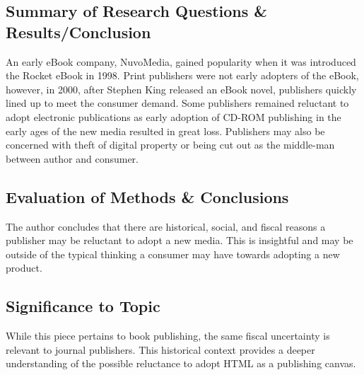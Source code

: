 \documentclass[leavefloats]{apa6e}\usepackage[]{graphicx}\usepackage[]{color}
\begin{document}



\regpar



\subsection{Summary of Research Questions \& Results/Conclusion} %
An early eBook company, NuvoMedia, gained popularity when it was introduced the Rocket eBook in 1998.  Print publishers were not early adopters of  the eBook, however, in 2000, after Stephen King released an eBook novel, publishers quickly lined up to meet the consumer demand.  Some publishers remained reluctant to adopt electronic publications as early adoption of CD-ROM publishing in the early ages of the new media  resulted in great loss.  Publishers may also be concerned with theft of digital property or being cut out as the middle-man between author and consumer.

\subsection{Evaluation of Methods \& Conclusions} %
The author concludes that there are historical, social, and fiscal reasons a publisher may be reluctant to adopt a new media.  This is insightful and may be outside of the typical thinking a consumer may have towards adopting a new product.

\subsection{Significance to Topic} %
While this piece pertains to book publishing, the same fiscal uncertainty is relevant to journal publishers.  This historical context provides a deeper understanding of the possible reluctance to adopt HTML as a publishing canvas.


 \section{\textcite{Peek1996a}}


\end{document}
